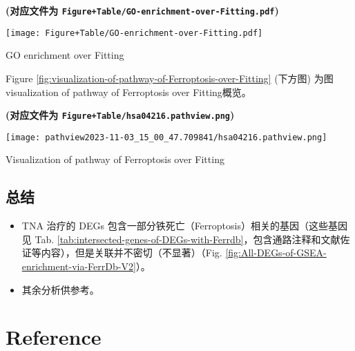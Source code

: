 \documentclass[
]{article}
\providecommand{\tightlist}{%
  \setlength{\itemsep}{0pt}\setlength{\parskip}{0pt}}
\begin{document}
\textbf{(对应文件为 \texttt{Figure+Table/GO-enrichment-over-Fitting.pdf})}

\def\@captype{figure}
\begin{center}
\texttt{[image: Figure+Table/GO-enrichment-over-Fitting.pdf]}
\caption{GO enrichment over Fitting}\label{fig:GO-enrichment-over-Fitting}
\end{center}

Figure \ref{fig:visualization-of-pathway-of-Ferroptosis-over-Fitting} (下方图) 为图visualization of pathway of Ferroptosis over Fitting概览。

\textbf{(对应文件为 \texttt{Figure+Table/hsa04216.pathview.png})}

\def\@captype{figure}
\begin{center}
\texttt{[image: pathview2023-11-03\_15\_00\_47.709841/hsa04216.pathview.png]}
\caption{Visualization of pathway of Ferroptosis over Fitting}\label{fig:visualization-of-pathway-of-Ferroptosis-over-Fitting}
\end{center}

\hypertarget{ux603bux7ed3}{%
\subsection{总结}\label{ux603bux7ed3}}

\begin{itemize}
\tightlist
\item
  TNA 治疗的 DEGs 包含一部分铁死亡（Ferroptosis）相关的基因（这些基因见 Tab. \ref{tab:intersected-genes-of-DEGs-with-Ferrdb}，包含通路注释和文献佐证等内容），但是关联并不密切（不显著）（Fig. \ref{fig:All-DEGs-of-GSEA-enrichment-via-FerrDb-V2}）。
\item
  其余分析供参考。
\end{itemize}

\hypertarget{bibliography}{%
\section*{Reference}\label{bibliography}}
\end{document}
